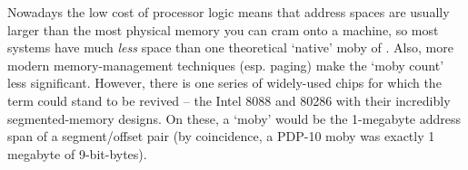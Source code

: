 Nowadays the low cost of processor logic means that address spaces are usually larger than the most physical memory you can cram onto a
machine, so most systems have much \textit{less} space than one theoretical `native' moby of . Also, more modern
memory-management techniques (esp. paging) make the `moby count' less significant. However, there is one series of widely-used chips for
which the term could stand to be revived -- the Intel 8088 and 80286 with their incredibly  segmented-memory
designs. On these, a `moby' would be the 1-megabyte address span of a segment/offset pair (by coincidence, a PDP-10 moby was exactly 1
megabyte of 9-bit-bytes).

